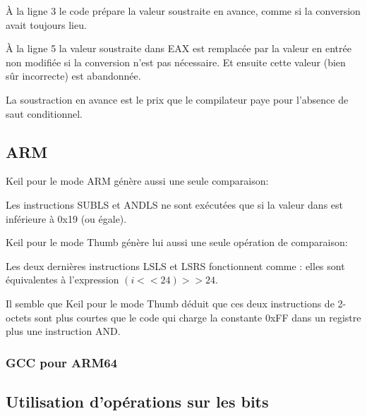 À la ligne 3 le code prépare la valeur soustraite en avance, comme si la conversion
avait toujours lieu.

À la ligne 5 la valeur soustraite dans EAX est remplacée par la valeur en entrée
non modifiée si la conversion n'est pas nécessaire.
Et ensuite cette valeur (bien sûr incorrecte) est abandonnée.

La soustraction en avance est le prix que le compilateur paye pour l'absence de saut
conditionnel.

\subsection{ARM}

Keil \Optimizing pour le mode ARM génère aussi une seule comparaison:



Les instructions SUBLS et ANDLS ne sont exécutées que si la valeur dans  est
inférieure à 0x19 (ou égale).

Keil \Optimizing pour le mode Thumb génère lui aussi une seule opération de comparaison:



Les deux dernières instructions LSLS et LSRS fonctionnent comme :
elles sont équivalentes à l'expression \CCpp $(i<<24)>>24$.

Il semble que Keil pour le mode Thumb déduit que ces deux instructions de 2-octets
sont plus courtes que le code qui charge la constante 0xFF dans un registre plus
une instruction AND.

\subsubsection{GCC pour ARM64}





\subsection{Utilisation d'opérations sur les bits}
\label{toupper_bit}

